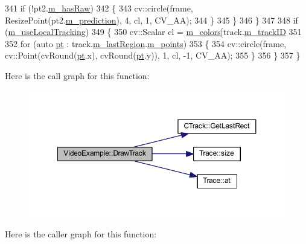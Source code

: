 \begin{DoxyCode}
341             \textcolor{keywordflow}{if} (!pt2.\mbox{\hyperlink{struct_trajectory_point_aedf0113745aff30b359a60401ddcf076}{m\_hasRaw}})
342             \{
343                 cv::circle(frame, ResizePoint(pt2.\mbox{\hyperlink{struct_trajectory_point_a967909b451c226e4927a2b96fcecbb6e}{m\_prediction}}), 4, cl, 1, CV\_AA);
344             \}
345         \}
346     \}
347 
348     \textcolor{keywordflow}{if} (\mbox{\hyperlink{class_video_example_a951ee017c4fbb180dfc965a9a35ac69f}{m\_useLocalTracking}})
349     \{
350         cv::Scalar cl = \mbox{\hyperlink{class_video_example_a2b6d4a6e85d52d13d8899c57cc6ddc66}{m\_colors}}[track.\mbox{\hyperlink{class_c_track_a8aae01d68f5a1a6c0292476ea19c89f9}{m\_trackID}} %
351 
352         \textcolor{keywordflow}{for} (\textcolor{keyword}{auto} \mbox{\hyperlink{rings_8cpp_af69bbacaaf68a115b351c5d1e29c3cc8}{pt}} : track.\mbox{\hyperlink{class_c_track_a5af91fbfad7ebf07bd0f681f915e440c}{m\_lastRegion}}.\mbox{\hyperlink{class_c_region_a65be08ae81a8d174d95ae35a2f7fb212}{m\_points}})
353         \{
354             cv::circle(frame, cv::Point(cvRound(\mbox{\hyperlink{rings_8cpp_af69bbacaaf68a115b351c5d1e29c3cc8}{pt}}.x), cvRound(\mbox{\hyperlink{rings_8cpp_af69bbacaaf68a115b351c5d1e29c3cc8}{pt}}.y)), 1, cl, -1, CV\_AA);
355         \}
356     \}
357 \}
\end{DoxyCode}
Here is the call graph for this function\+:
\nopagebreak
\begin{figure}[H]
\begin{center}
\leavevmode
\includegraphics[width=350pt]{class_video_example_a84a040bc87b915c5ee18c5d11235f40c_cgraph}
\end{center}
\end{figure}
Here is the caller graph for this function\+:
\nopagebreak
